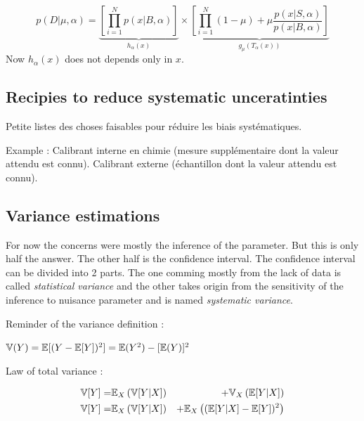 \begin{equation}
	p(D|\mu, \alpha) = \underbrace{\left[ \prod_{i=1}^N p(x|B, \alpha) \right ]}_{h_\alpha(x)} \times 
       \underbrace{\left [\prod_{i=1}^N (1-\mu) + \mu \frac{p(x|S, \alpha)}{p(x|B, \alpha)} \right ]}_{g_\mu(T_\alpha(x))}
\end{equation}
Now $h_\alpha(x)$ does not depends only in $x$.






\subsection{Recipies to reduce systematic unceratinties} %
\label{sub:recipies_to_reduce_systematic_unceratinties}


Petite listes des choses faisables pour réduire les biais systématiques. 


Example : Calibrant interne en chimie (mesure supplémentaire dont la valeur attendu est connu). Calibrant externe (échantillon dont la valeur attendu est connu).








\subsection{Variance estimations} %
\label{sub:variance_estimations}

For now the concerns were mostly the inference of the parameter.
But this is only half the answer.
The other half is the confidence interval.
The confidence interval can be divided into 2 parts.
The one comming mostly from the lack of data is called \emph{statistical variance} and the other takes origin from the sensitivity of the inference to nuisance parameter and is named \emph{systematic variance}.

Reminder of the variance definition :

$\mathbb{V}(Y) = \mathbb{E}[(Y - \mathbb{E}[Y])^2] = \mathbb{E}(Y^2) - [\mathbb{E}(Y)]^2$

Law of total variance \needcite :

\begin{eqnarray}
\label{eq:total_variance_law}
    \mathbb{V}[Y] =& \mathbb{E}_X \left (\mathbb{V}[Y|X] \right ) &+ \mathbb{V}_X \left (\mathbb{E}[Y|X]\right ) \\
    \mathbb{V}[Y] =& \mathbb{E}_X \left (\mathbb{V}[Y|X] \right ) &+ \mathbb{E}_X \left ( (\mathbb{E} [Y|X]  - \mathbb{E}[Y])^2\right )
\end{eqnarray}


